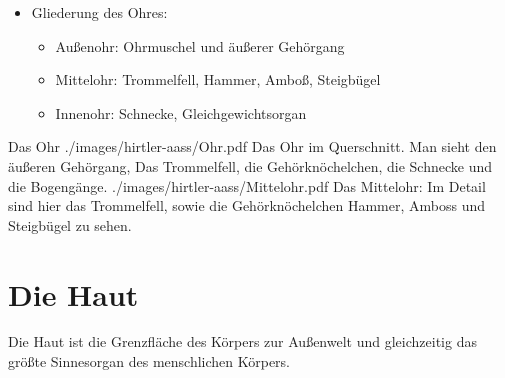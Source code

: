 {%
\begin{itemize}
  \item Gliederung des Ohres:
  \begin{itemize}
    \item Außenohr: Ohrmuschel und äußerer Gehörgang
    \item Mittelohr: Trommelfell, Hammer, Amboß, Steigbügel
    \item Innenohr: Schnecke, Gleichgewichtsorgan
  \end{itemize}
\end{itemize}
}{}{}{}

\begin{PictureSeries}{}{Das Ohr}
{./images/hirtler-aass/Ohr.pdf}
{Das Ohr im Querschnitt. Man sieht
den äußeren Gehörgang, Das
Trommelfell, die Gehörknöchelchen,
die Schnecke und die Bogengänge. }
{./images/hirtler-aass/Mittelohr.pdf} {Das Mittelohr: Im Detail sind hier
das Trommelfell, sowie die Gehörknöchelchen Hammer, Amboss
und Steigbügel zu sehen.
}
{}
{}
{}
{}
\end{PictureSeries}



\section{Die Haut}
\label{topic:haut}



\noindent Die Haut ist die Grenzfläche des Körpers zur
Außenwelt und gleichzeitig das größte Sinnesorgan des
menschlichen Körpers.

